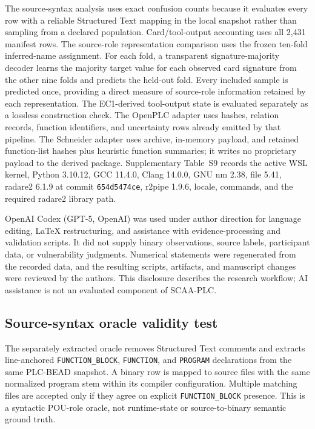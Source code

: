 \documentclass[a4paper,fleqn]{cas-dc}
\begin{document}
The source-syntax analysis uses exact confusion counts because it evaluates every row with a reliable Structured Text mapping in the local snapshot rather than sampling from a declared population. Card/tool-output accounting uses all 2{,}431 manifest rows. The source-role representation comparison uses the frozen ten-fold inferred-name assignment. For each fold, a transparent signature-majority decoder learns the majority target value for each observed card signature from the other nine folds and predicts the held-out fold. Every included sample is predicted once, providing a direct measure of source-role information retained by each representation. The EC1-derived tool-output state is evaluated separately as a lossless construction check. The OpenPLC adapter uses hashes, relation records, function identifiers, and uncertainty rows already emitted by that pipeline. The Schneider adapter uses archive, in-memory payload, and retained function-list hashes plus heuristic function summaries; it writes no proprietary payload to the derived package. Supplementary Table~S9 records the active WSL kernel, Python 3.10.12, GCC 11.4.0, Clang 14.0.0, GNU nm 2.38, file 5.41, radare2 6.1.9 at commit \texttt{654d5474ce}, r2pipe 1.9.6, locale, commands, and the required radare2 library path.

OpenAI Codex (GPT-5, OpenAI) was used under author direction for language editing, LaTeX restructuring, and assistance with evidence-processing and validation scripts. It did not supply binary observations, source labels, participant data, or vulnerability judgments. Numerical statements were regenerated from the recorded data, and the resulting scripts, artifacts, and manuscript changes were reviewed by the authors. This disclosure describes the research workflow; AI assistance is not an evaluated component of SCAA-PLC.

\subsection{Source-syntax oracle validity test}
\label{sec:source_oracle}

The separately extracted oracle removes Structured Text comments and extracts line-anchored \texttt{FUNCTION\_BLOCK}, \texttt{FUNCTION}, and \texttt{PROGRAM} declarations from the same PLC-BEAD snapshot. A binary row is mapped to source files with the same normalized program stem within its compiler configuration. Multiple matching files are accepted only if they agree on explicit \texttt{FUNCTION\_BLOCK} presence. This is a syntactic POU-role oracle, not runtime-state or source-to-binary semantic ground truth.
\end{document}
